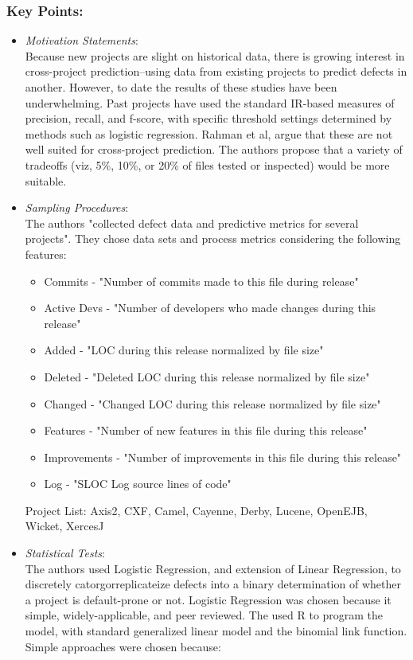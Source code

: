\documentclass{sig-alternate-05-2015}
\begin{document}
\subsubsection{Key Points:}
\begin{itemize}
\item \emph{ Motivation Statements}: \\
Because new projects are slight on historical data, there is growing interest in cross-project prediction--using data from existing projects to predict defects in another. However, to date the results of these studies have been underwhelming. Past projects have used the standard IR-based measures of precision, recall, and f-score, with specific threshold settings determined by methods such as logistic regression. Rahman et al, argue that these are not well suited for cross-project prediction. The authors propose that a variety of tradeoffs (viz, 5\%, 10\%, or 20\% of files tested or inspected) would be more suitable.
\item \emph{Sampling Procedures}: \\
The authors "collected defect data and predictive metrics for several projects". They chose data sets and process metrics considering the following features:
	\begin{itemize}
		\item Commits - "Number of commits made to this file during release"
		\item Active Devs - "Number of developers who made changes during this release"
		\item Added - "LOC during this release normalized by file size"
		\item Deleted - "Deleted LOC during this release normalized by file size"
		\item Changed - "Changed LOC during this release normalized by file size"
		\item Features - "Number of new features in this file during this release"
		\item Improvements - "Number of improvements in this file during this release"
		\item Log - "SLOC Log source lines of code"
	\end{itemize}
Project List: Axis2, CXF, Camel, Cayenne, Derby, Lucene, OpenEJB, Wicket, XercesJ
\item \emph{Statistical Tests}: \\
The authors used Logistic Regression, and extension of Linear Regression, to discretely catorgorreplicateize defects into a binary determination of whether a project is default-prone or not. Logistic Regression was chosen because it simple, widely-applicable, and peer reviewed. The used R to program the model, with standard generalized linear model and the binomial link function. Simple approaches were chosen because:

\end{itemize}
\end{document}
